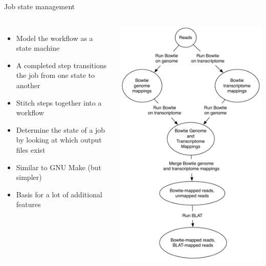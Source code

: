 \documentclass{beamer}
\begin{document}
\begin{frame}{Job state management}
  \begin{columns}
    \column{2.75in}
  \begin{itemize}
  \item Model the workflow as a state machine
  \item A completed step transitions the job from one state to another
  \item Stitch steps together into a workflow
  \item Determine the state of a job by looking at which output
    files exist
  \item Similar to GNU Make (but simpler)
  \item Basis for a lot of additional features
  \end{itemize}
    \column{2.25in}
    \includegraphics[scale=0.3]{state-machine.pdf}
  \end{columns}
\end{frame}
\end{document}
